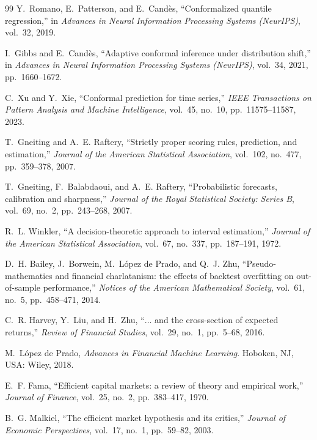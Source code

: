 \documentclass[11pt,a4paper]{article}
\begin{document}
\begin{thebibliography}{99}
 Y.~Romano, E.~Patterson, and E.~Cand\`es, ``Conformalized quantile
regression,'' in \emph{Advances in Neural Information Processing Systems (NeurIPS)},
vol.\ 32, 2019.

 I.~Gibbs and E.~Cand\`es, ``Adaptive conformal inference under
distribution shift,'' in \emph{Advances in Neural Information Processing Systems
(NeurIPS)}, vol.\ 34, 2021, pp.\ 1660--1672.

 C.~Xu and Y.~Xie, ``Conformal prediction for time series,'' \emph{IEEE
Transactions on Pattern Analysis and Machine Intelligence}, vol.\ 45, no.\ 10,
pp.\ 11575--11587, 2023.

 T.~Gneiting and A.~E. Raftery, ``Strictly proper scoring rules,
prediction, and estimation,'' \emph{Journal of the American Statistical Association},
vol.\ 102, no.\ 477, pp.\ 359--378, 2007.

 T.~Gneiting, F.~Balabdaoui, and A.~E. Raftery,
``Probabilistic forecasts, calibration and sharpness,'' \emph{Journal of the Royal
Statistical Society: Series B}, vol.\ 69, no.\ 2, pp.\ 243--268, 2007.

 R.~L. Winkler, ``A decision-theoretic approach to interval
estimation,'' \emph{Journal of the American Statistical Association}, vol.\ 67,
no.\ 337, pp.\ 187--191, 1972.

 D.~H. Bailey, J.~Borwein, M.~L\'opez de Prado, and Q.~J. Zhu,
``Pseudo-mathematics and financial charlatanism: the effects of backtest overfitting
on out-of-sample performance,'' \emph{Notices of the American Mathematical Society},
vol.\ 61, no.\ 5, pp.\ 458--471, 2014.

 C.~R. Harvey, Y.~Liu, and H.~Zhu, ``$\ldots$ and the
cross-section of expected returns,'' \emph{Review of Financial Studies}, vol.\ 29,
no.\ 1, pp.\ 5--68, 2016.

 M.~L\'opez de Prado, \emph{Advances in Financial Machine
Learning}. Hoboken, NJ, USA: Wiley, 2018.

 E.~F. Fama, ``Efficient capital markets: a review of theory and
empirical work,'' \emph{Journal of Finance}, vol.\ 25, no.\ 2, pp.\ 383--417, 1970.

 B.~G. Malkiel, ``The efficient market hypothesis and its
critics,'' \emph{Journal of Economic Perspectives}, vol.\ 17, no.\ 1, pp.\ 59--82,
2003.


\end{thebibliography}
\end{document}
